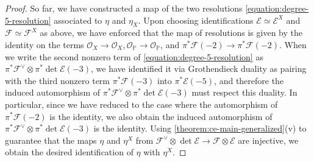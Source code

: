 \documentclass[12 pt]{amsart}
\theoremstyle{plain}
\theoremstyle{definition}
\theoremstyle{remark}
\numberwithin{equation}{section}
\newcommand\bp{\mathbb P}
\newcommand\sce{\mathscr E}
\newcommand\scf{\mathscr F}
\newcommand\sco{\mathscr O}
\begin{document}
\begin{proof}
	So far, we have constructed a map of the two resolutions
	\eqref{equation:degree-5-resolution} associated to $\eta$ and $\eta_X$.
	Upon choosing identifications $\sce \simeq \sce^X$ and
	$\scf \simeq \scf^X$ as above, we have enforced that the map of
	resolutions is given by the identity on the terms
	$\sco_X \to \sco_X, \sco_{\bp} \to \sco_{\bp}$, and $\pi^* \scf(-2) \to
	\pi^* \scf(-2)$. 
	When we write the second nonzero term of
	\eqref{equation:degree-5-resolution} as $\pi^* \scf^\vee \otimes \pi^*
	\det \sce(-3)$, we have identified it via Grothendieck duality
	as pairing with the third nonzero term $\pi^* \scf(-3)$ into $\pi^*
	\sce(-5)$, and therefore the induced automorphism of
	$\pi^* \scf^\vee \otimes \pi^* \det \sce(-3)$ must respect this
	duality. In particular, since we have reduced to the case where the automorphism of $\pi^* \scf(-2)$
	is the identity, we also obtain the induced automorphism of 
	$\pi^* \scf^\vee \otimes \pi^* \det \sce(-3)$ is the identity.
	Using \autoref{theorem:ce-main-generalized}(v)
	to guarantee that the maps $\eta$ and $\eta^X$ from $\scf^\vee \otimes
	\det \sce \to \scf \otimes \sce$ are injective, we obtain the desired
	identification of $\eta$ with $\eta^X$.
\end{proof}
\end{document}
